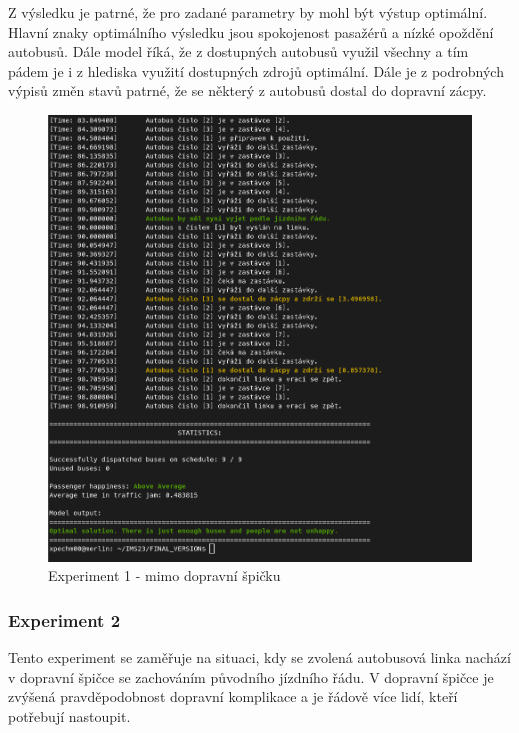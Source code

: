 \documentclass[a4paper]{article}
\begin{document}
				Z výsledku je patrné, že pro zadané parametry by mohl být výstup optimální. Hlavní znaky optimálního výsledku jsou spokojenost pasažérů a nízké opoždění autobusů. Dále model říká, že z dostupných autobusů využil všechny a tím pádem je i z hlediska využití dostupných zdrojů optimální. Dále je z podrobných výpisů změn stavů patrné, že se některý z autobusů dostal do dopravní zácpy.

                \begin{figure}[H]
                \includegraphics[scale=0.45, keepaspectratio]{fig/ims_bus1.png}
                \caption{Experiment 1 - mimo dopravní špičku}
                \label{fig:experiment1}
            \end{figure}
        \newpage
            \subsubsection{Experiment 2}
            \label{subsubsec:experiment2}
				Tento experiment se zaměřuje na situaci, kdy se zvolená autobusová linka nachází v dopravní špičce se zachováním původního jízdního řádu. V dopravní špičce je zvýšená pravděpodobnost dopravní komplikace a je řádově více lidí, kteří potřebují nastoupit.
\end{document}
